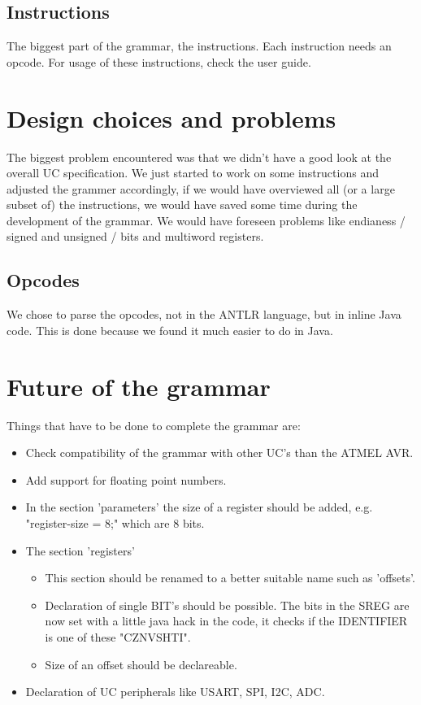\subsection{Instructions}
The biggest part of the grammar, the instructions. Each instruction needs an opcode. For usage of these instructions, check the user guide.

\section{Design choices and problems}
The biggest problem encountered was that we didn't have a good look at the overall \ac{UC} specification. We just started to work on some instructions and adjusted the grammer accordingly, if we would have overviewed all (or a large subset of) the instructions, we would have saved some time during the development of the grammar. We would have foreseen problems like endianess / signed and unsigned / bits and multiword registers.

\subsection{Opcodes}
We chose to parse the opcodes, not in the ANTLR language, but in inline Java code. This is done because we found it much easier to do in Java.

\section{Future of the grammar}
Things that have to be done to complete the grammar are:
\begin{itemize}
\item Check compatibility of the grammar with other \ac{UC}'s than the ATMEL AVR.
\item Add support for floating point numbers.
\item In the section 'parameters' the size of a register should be added, e.g. "register-size = 8;" which are 8 bits.
\item The section 'registers'
\begin{itemize}
\item This section should be renamed to a better suitable name such as 'offsets'.
\item Declaration of single BIT's should be possible. The bits in the \ac{SREG} are now set with a little java hack in the code, it checks if the IDENTIFIER is one of these "CZNVSHTI".  
\item Size of an offset should be declareable.
\end{itemize}
\item Declaration of \ac{UC} peripherals like USART, SPI, I2C, ADC.
\end{itemize}
